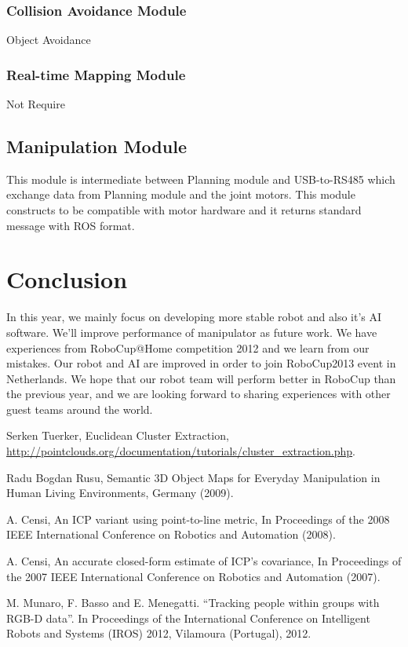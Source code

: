 \documentclass{llncs}
\begin{document}
\subsubsection{Collision Avoidance Module}

Object Avoidance

\subsubsection{Real-time Mapping Module}

Not Require

\subsection{Manipulation Module}

This module is intermediate between Planning module and USB-to-RS485 which exchange data from Planning module and the joint motors. This module constructs to be compatible with motor hardware and it returns standard message with ROS format.

\section{Conclusion}

In this year, we mainly focus on developing more stable robot and also it's AI software. We'll improve performance of manipulator as future work. We have experiences from RoboCup@Home competition 2012 and we learn from our mistakes. Our robot and AI are improved in order to join RoboCup2013 event in Netherlands. We hope that our robot team will perform better in RoboCup than the previous year, and we are looking forward to sharing experiences with other guest teams around the world.

\begin{thebibliography}{4}

 Serken Tuerker, Euclidean Cluster Extraction,\\
\url{http://pointclouds.org/documentation/tutorials/cluster_extraction.php}.

 Radu Bogdan Rusu, 
Semantic 3D Object Maps for Everyday Manipulation in Human Living Environments, Germany (2009).

 A. Censi, An ICP variant using point-to-line metric, In Proceedings of the 2008 IEEE International Conference on Robotics and Automation (2008).

 A. Censi, An accurate closed-form estimate of ICP's covariance, In Proceedings of the 2007 IEEE International Conference on Robotics and Automation (2007).

 M. Munaro, F. Basso and E. Menegatti. “Tracking people within groups with RGB-D data”. In Proceedings of the International Conference on Intelligent Robots and Systems (IROS) 2012, Vilamoura (Portugal), 2012.

\end{thebibliography}
\end{document}
